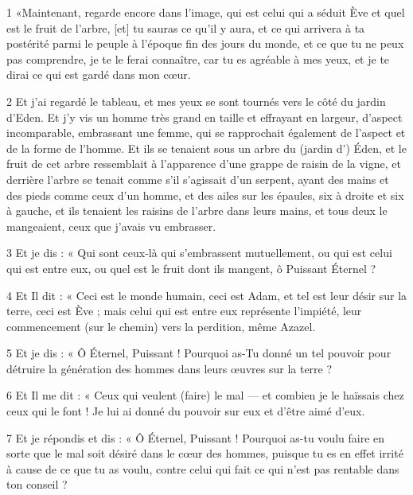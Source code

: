 
\par 1 «Maintenant, regarde encore dans l'image, qui est celui qui a séduit Ève et quel est le fruit de l'arbre, [et] tu sauras ce qu'il y aura, et ce qui arrivera à ta postérité parmi le peuple à l'époque fin des jours du monde, et ce que tu ne peux pas comprendre, je te le ferai connaître, car tu es agréable à mes yeux, et je te dirai ce qui est gardé dans mon cœur.

\par 2 Et j'ai regardé le tableau, et mes yeux se sont tournés vers le côté du jardin d'Eden. Et j'y vis un homme très grand en taille et effrayant en largeur, d'aspect incomparable, embrassant une femme, qui se rapprochait également de l'aspect et de la forme de l'homme. Et ils se tenaient sous un arbre du (jardin d') Éden, et le fruit de cet arbre ressemblait à l'apparence d'une grappe de raisin de la vigne, et derrière l'arbre se tenait comme s'il s'agissait d'un serpent, ayant des mains et des pieds comme ceux d'un homme, et des ailes sur les épaules, six à droite et six à gauche, et ils tenaient les raisins de l'arbre dans leurs mains, et tous deux le mangeaient, ceux que j'avais vu embrasser.

\par 3 Et je dis : « Qui sont ceux-là qui s'embrassent mutuellement, ou qui est celui qui est entre eux, ou quel est le fruit dont ils mangent, ô Puissant Éternel ?

\par 4 Et Il dit : « Ceci est le monde humain, ceci est Adam, et tel est leur désir sur la terre, ceci est Ève ; mais celui qui est entre eux représente l'impiété, leur commencement (sur le chemin) vers la perdition, même Azazel.

\par 5 Et je dis : « Ô Éternel, Puissant ! Pourquoi as-Tu donné un tel pouvoir pour détruire la génération des hommes dans leurs œuvres sur la terre ?

\par 6 Et Il me dit : « Ceux qui veulent (faire) le mal — et combien je le haïssais chez ceux qui le font ! Je lui ai donné du pouvoir sur eux et d'être aimé d'eux.

\par 7 Et je répondis et dis : « Ô Éternel, Puissant ! Pourquoi as-tu voulu faire en sorte que le mal soit désiré dans le cœur des hommes, puisque tu es en effet irrité à cause de ce que tu as voulu, contre celui qui fait ce qui n'est pas rentable dans ton conseil ?

